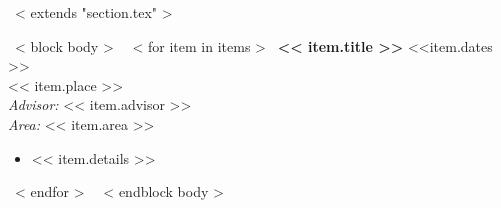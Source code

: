 ~< extends "section.tex" >~

~< block body >~
    ~< for item in items >~
	  {\bf << item.title >>} \hfill <<item.dates >>\\
	  {{ << item.place >>}}\\
	  {\it Advisor:} << item.advisor >>\\
	  {\it Area:} << item.area >>
	  \begin{itemize}
	  \item << item.details >>
	  \end{itemize}
	  \vspace{3mm}
    ~< endfor >~
~< endblock body >~
